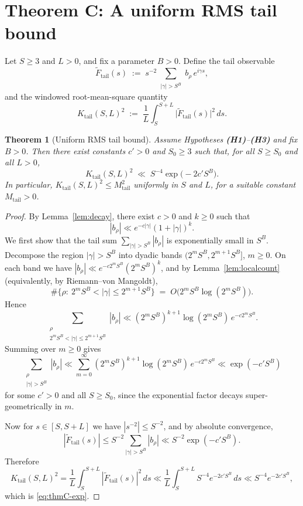\documentclass[11pt]{article}
\theoremstyle{plain}
\newtheorem{theorem}{Theorem}[section]
\theoremstyle{definition}
\begin{document}
\section{Theorem C: A uniform RMS tail bound}
Let $S\ge 3$ and $L>0$, and fix a parameter $B>0$. Define the tail observable
\[
  \widetilde F_{\mathrm{tail}}(s) \;:=\; s^{-2} \sum_{\substack{|\gamma|>S^B}} b_\rho\, e^{i\gamma s},
\]
and the windowed root-mean-square quantity
\[
  K_{\mathrm{tail}}(S,L)^2 \;:=\; \frac{1}{L} \int_{S}^{S+L} \bigl|\widetilde F_{\mathrm{tail}}(s)\bigr|^2 \, ds.
\]

\begin{theorem}[Uniform RMS tail bound]\label{thm:C}
Assume Hypotheses \textbf{(H1)}--\textbf{(H3)} and fix $B>0$. Then there exist constants $c'>0$ and $S_0\ge 3$ such that, for all $S\ge S_0$ and all $L>0$,
\begin{equation}\label{eq:thmC-exp}
  K_{\mathrm{tail}}(S,L)^2 \;\ll\; S^{-4}\exp\!\bigl(-2c' S^{B}\bigr).
\end{equation}
In particular, $K_{\mathrm{tail}}(S,L)^2\le M_{\mathrm{tail}}^2$ uniformly in $S$ and $L$, for a suitable constant $M_{\mathrm{tail}}>0$.
\end{theorem}

\begin{proof}
By Lemma~\ref{lem:decay}, there exist $c>0$ and $k\ge 0$ such that
\[
  |b_\rho| \ll e^{-c|\gamma|}(1+|\gamma|)^{k}.
\]
We first show that the tail sum $\sum_{|\gamma|>S^B}|b_\rho|$ is exponentially small in $S^B$.
Decompose the region $|\gamma|>S^B$ into dyadic bands $(2^m S^B,2^{m+1}S^B]$, $m\ge 0$. On each band we have
$|b_\rho|\ll e^{-c2^mS^B}(2^mS^B)^k$, and by Lemma~\ref{lem:localcount} (equivalently, by Riemann--von Mangoldt),
\[
  \#\{\rho:\ 2^mS^B<|\gamma|\le 2^{m+1}S^B\}
  \;=\; O\!\bigl(2^mS^B\log(2^mS^B)\bigr).
\]
Hence
\[
  \sum_{\substack{\rho\\ 2^mS^B<|\gamma|\le 2^{m+1}S^B}} |b_\rho|
  \ll (2^mS^B)^{k+1}\log(2^mS^B)\,e^{-c2^mS^B}.
\]
Summing over $m\ge 0$ gives
\[
  \sum_{\substack{\rho\\ |\gamma|>S^B}} |b_\rho|
  \ll \sum_{m=0}^\infty (2^mS^B)^{k+1}\log(2^mS^B)\,e^{-c2^mS^B}
  \ll \exp(-c' S^B)
\]
for some $c'>0$ and all $S\ge S_0$, since the exponential factor decays super-geometrically in $m$.

Now for $s\in[S,S+L]$ we have $|s^{-2}|\le S^{-2}$, and by absolute convergence,
\[
  |\widetilde F_{\mathrm{tail}}(s)|
  \le S^{-2}\sum_{|\gamma|>S^B}|b_\rho|
  \ll S^{-2}\exp(-c'S^B).
\]
Therefore
\[
  K_{\mathrm{tail}}(S,L)^2
  =\frac1L\int_S^{S+L}|\widetilde F_{\mathrm{tail}}(s)|^2\,ds
  \ll \frac1L\int_S^{S+L} S^{-4}e^{-2c'S^B}\,ds
  \ll S^{-4}e^{-2c'S^B},
\]
which is \eqref{eq:thmC-exp}.
\end{proof}
\end{document}

